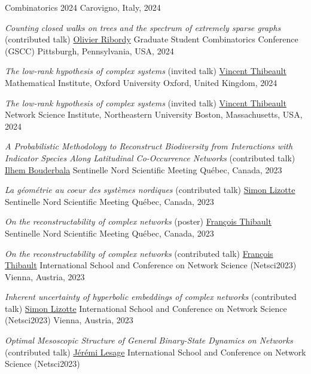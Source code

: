 \documentclass[11pt]{article}
\makeatletter
\newcommand{\reversearabic}[1]{\expandafter\@reversearabic\csname c@#1\endcsname}
\newcommand{\@reversearabic}[1]{%
  \number\numexpr\getrefnumber{this@etaremune@\romannumeral\c@etaremune}-#1+1\relax
}
\newcounter{etaremune}
\newenvironment{etaremune}[1][]{%
  \stepcounter{etaremune}%
  \begin{enumerate}[label=\reversearabic*.,#1]%
}{%
  \edef\@currentlabel{\the\csname c@\@enumctr\endcsname}%
  \label{this@etaremune@\romannumeral\c@etaremune}%
  \end{enumerate}%
}
\makeatother
\begin{document}
\begin{etaremune}[itemsep=0.5em, label={[M\reversearabic*]}, first*=\small\vspace{0.5\baselineskip}]
{  Combinatorics 2024\split
  Carovigno, Italy, 2024}
%
  \item \parbox[t]{\textwidth-30pt}{\textit{Counting closed walks on trees and the spectrum of extremely sparse graphs} (contributed talk)\split
  \uline{Olivier Ribordy}\split
  Graduate Student Combinatorics Conference (GSCC)\split
  Pittsburgh, Pennsylvania, USA, 2024}
%
  \item \parbox[t]{\textwidth-30pt}{\textit{The low-rank hypothesis of complex systems} (invited talk)\split
  \uline{Vincent Thibeault}\split
  Mathematical Institute, Oxford University\split
  Oxford, United Kingdom, 2024}
%
  \item \parbox[t]{\textwidth-30pt}{\textit{The low-rank hypothesis of complex systems} (invited talk)\split
  \uline{Vincent Thibeault}\split
  Network Science Institute, Northeastern University\split
  Boston, Massachusetts, USA, 2024}
%
  \item \parbox[t]{\textwidth-30pt}{\textit{A Probabilistic Methodology to Reconstruct Biodiversity from Interactions with Indicator Species Along Latitudinal Co-Occurrence Networks} (contributed talk)\split
  \uline{Ilhem Bouderbala}\split
  Sentinelle Nord Scientific Meeting\split
  Québec, Canada, 2023}
%
  \item \parbox[t]{\textwidth-30pt}{\textit{La géométrie au coeur des systèmes nordiques} (contributed talk)\split
  \uline{Simon Lizotte}\split
  Sentinelle Nord Scientific Meeting\split
  Québec, Canada, 2023}
%
  \item \parbox[t]{\textwidth-30pt}{\textit{On the reconstructability of complex networks} (poster)\split
  \uline{François Thibault}\split
  Sentinelle Nord Scientific Meeting\split
  Québec, Canada, 2023}
%
  \item \parbox[t]{\textwidth-30pt}{\textit{On the reconstructability of complex networks} (contributed talk)\split
  \uline{François Thibault}\split
  International School and Conference on Network Science (Netsci2023)\split
  Vienna, Austria, 2023}
%
  \item \parbox[t]{\textwidth-30pt}{\textit{Inherent uncertainty of hyperbolic embeddings of complex networks} (contributed talk)\split
  \uline{Simon Lizotte}\split
  International School and Conference on Network Science (Netsci2023)\split
  Vienna, Austria, 2023}
%
  \item \parbox[t]{\textwidth-30pt}{\textit{Optimal Mesoscopic Structure of General Binary-State Dynamics on Networks} (contributed talk)\split
  \uline{Jérémi Lesage}\split
  International School and Conference on Network Science (Netsci2023)\split
}
\end{etaremune}
\end{document}
